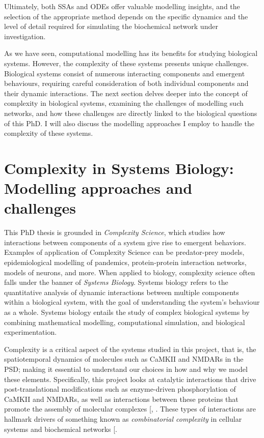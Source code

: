 \documentclass[
  11pt,
  letterpaper,
]{scrreprt}
\begin{document}
Ultimately, both SSAs and ODEs offer valuable modelling insights, and
the selection of the appropriate method depends on the specific dynamics
and the level of detail required for simulating the biochemical network
under investigation.

As we have seen, computational modelling has its benefits for studying
biological systems. However, the complexity of these systems presents
unique challenges. Biological systems consist of numerous interacting
components and emergent behaviours, requiring careful consideration of
both individual components and their dynamic interactions. The next
section delves deeper into the concept of complexity in biological
systems, examining the challenges of modelling such networks, and how
these challenges are directly linked to the biological questions of this
PhD. I will also discuss the modelling approaches I employ to handle the
complexity of these systems.

\section{Complexity in Systems Biology: Modelling approaches and
challenges}\label{sec-complexity-systems-biology}

This PhD thesis is grounded in \emph{Complexity Science}, which studies
how interactions between components of a system give rise to emergent
behaviors. Examples of application of Complexity Science can be
predator-prey models, epidemiological modelling of pandemics,
protein-protein interaction networks, models of neurons, and more. When
applied to biology, complexity science often falls under the banner of
\emph{Systems Biology}. Systems biology refers to the quantitative
analysis of dynamic interactions between multiple components within a
biological system, with the goal of understanding the system's behaviour
as a whole. Systems biology entails the study of complex biological
systems by combining mathematical modelling, computational simulation,
and biological experimentation.

Complexity is a critical aspect of the systems studied in this project,
that is, the spatiotemporal dynamics of molecules such as CaMKII and
NMDARs in the PSD; making it essential to understand our choices in how
and why we model these elements. Specifically, this project looks at
catalytic interactions that drive post-translational modifications such
as enzyme-driven phosphorylation of CaMKII and NMDARs, as well as
interactions between these proteins that promote the assembly of
molecular complexes {[},
\citeproc{ref-2015Biochemical}{10}{]}. These types of interactions are
hallmark drivers of something known as \emph{combinatorial complexity}
in cellular systems and biochemical networks
{[}\citeproc{ref-klamt2002Combinatorial}{281}{]}.
\end{document}
